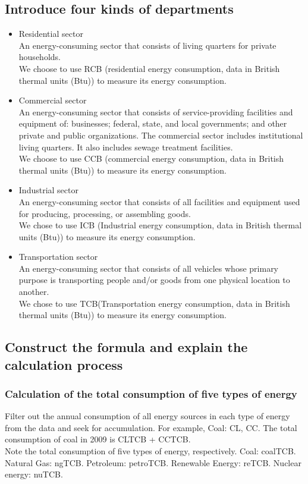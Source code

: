 \documentclass{mcmthesis}
\begin{document}
\subsection{Introduce four kinds of departments}
\begin{itemize}
  \item Residential sector\\
  An energy-consuming sector that consists of living quarters for private households.\\
  We choose to use RCB (residential energy consumption, data in British thermal units (Btu)) to measure its energy consumption.
  \item Commercial sector\\
  An energy-consuming sector that consists of service-providing facilities and equipment of: businesses; federal, state, and local governments; and other private and public organizations. The commercial sector includes institutional living quarters. It also includes sewage treatment facilities.\\
  We choose to use CCB (commercial energy consumption, data in British thermal units (Btu)) to measure its energy consumption.
  \item Industrial sector\\
  An energy-consuming sector that consists of all facilities and equipment used for producing, processing, or assembling goods.\\
  We chose to use ICB (Industrial energy consumption, data in British thermal units (Btu)) to measure its energy consumption.
  \item Transportation sector\\
  An energy-consuming sector that consists of all vehicles whose primary purpose is transporting people and/or goods from one physical location to another.\\
  We chose to use TCB(Transportation energy consumption, data in British thermal units (Btu)) to measure its energy consumption.
\end{itemize}
\subsection{Construct the formula and explain the calculation process}
\subsubsection{Calculation of the total consumption of five types of energy}
Filter out the annual consumption of all energy sources in each type of energy from the data and seek for accumulation.
For example, Coal: CL, CC. The total consumption of coal in 2009 is CLTCB + CCTCB. \\
Note the total consumption of five types of energy, respectively. Coal: coalTCB. Natural Gas: ngTCB. Petroleum: petroTCB. Renewable Energy: reTCB. Nuclear energy: nuTCB.
\end{document}
